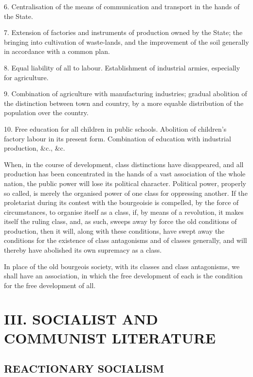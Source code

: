 \documentclass[11pt]{book}
\begin{document}
6.  Centralisation of the means of communication and transport
    in the hands of the State.

7.  Extension of factories and instruments of production owned by
    the State; the bringing into cultivation of waste-lands, and
    the improvement of the soil generally in accordance with a
    common plan.

8.  Equal liability of all to labour.  Establishment of
    industrial armies, especially for agriculture.

9.  Combination of agriculture with manufacturing industries;
    gradual abolition of the distinction between town and
    country, by a more equable distribution of the population
    over the country.

10. Free education for all children in public schools.
    Abolition of children's factory labour in its present form.
    Combination of education with industrial production, \&c., \&c.

When, in the course of development, class distinctions have
disappeared, and all production has been concentrated in the
hands of a vast association of the whole nation, the public power
will lose its political character.  Political power, properly so
called, is merely the organised power of one class for oppressing
another.  If the proletariat during its contest with the
bourgeoisie is compelled, by the force of circumstances, to
organise itself as a class, if, by means of a revolution, it
makes itself the ruling class, and, as such, sweeps away by force
the old conditions of production, then it will, along with these
conditions, have swept away the conditions for the existence of
class antagonisms and of classes generally, and will thereby have
abolished its own supremacy as a class.

In place of the old bourgeois society, with its classes and
class antagonisms, we shall have an association, in which
the free development of each is the condition for the free
development of all.



\chapter*{III.  SOCIALIST AND COMMUNIST LITERATURE}


\section{REACTIONARY SOCIALISM}
\end{document}
